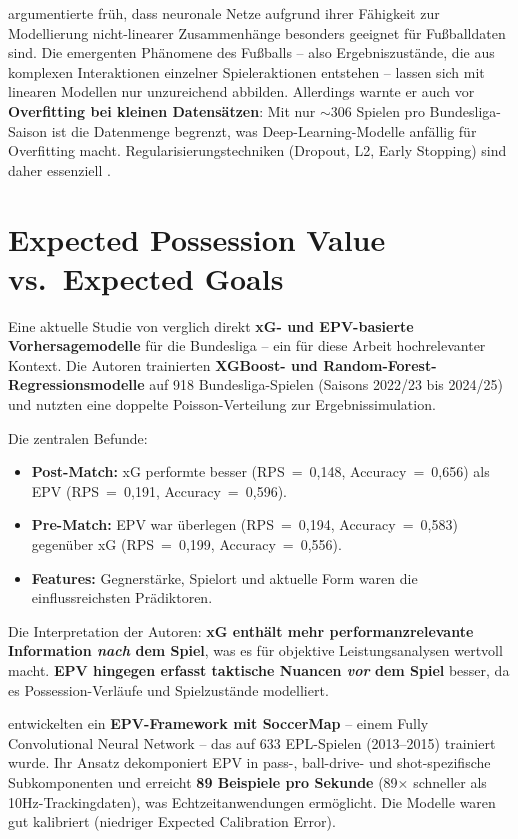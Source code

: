 \textcite{Sumpter2016} argumentierte früh, dass neuronale Netze aufgrund ihrer Fähigkeit zur Modellierung nicht-linearer Zusammenhänge besonders geeignet für Fußballdaten sind. Die \glqq emergenten Phänomene\grqq{} des Fußballs -- also Ergebniszustände, die aus komplexen Interaktionen einzelner Spieleraktionen entstehen -- lassen sich mit linearen Modellen nur unzureichend abbilden. Allerdings warnte er auch vor \textbf{Overfitting bei kleinen Datensätzen}: Mit nur $\sim$306 Spielen pro Bundesliga-Saison ist die Datenmenge begrenzt, was Deep-Learning-Modelle anfällig für Overfitting macht. Regularisierungstechniken (Dropout, L2, Early Stopping) sind daher essenziell \cite{GoodfellowEtAl2016,SrivastavaEtAl2014}.

\section{Expected Possession Value vs.\ Expected Goals}
\label{sec:epv-vs-xg}

Eine aktuelle Studie von \textcite{ForcherEtAl2025} verglich direkt \textbf{xG- und EPV-basierte Vorhersagemodelle} für die Bundesliga -- ein für diese Arbeit hochrelevanter Kontext. Die Autoren trainierten \textbf{XGBoost- und Random-Forest-Regressionsmodelle} auf 918 Bundesliga-Spielen (Saisons 2022/23 bis 2024/25) und nutzten eine doppelte Poisson-Verteilung zur Ergebnissimulation.

Die zentralen Befunde:
\begin{itemize}
    \item \textbf{Post-Match:} xG performte besser (RPS~=~0,148, Accuracy~=~0,656) als EPV (RPS~=~0,191, Accuracy~=~0,596).
    \item \textbf{Pre-Match:} EPV war überlegen (RPS~=~0,194, Accuracy~=~0,583) gegenüber xG (RPS~=~0,199, Accuracy~=~0,556).
    \item \textbf{Features:} Gegnerstärke, Spielort und aktuelle Form waren die einflussreichsten Prädiktoren.
\end{itemize}

Die Interpretation der Autoren: \textbf{xG enthält mehr performanzrelevante Information \textit{nach} dem Spiel}, was es für objektive Leistungsanalysen wertvoll macht. \textbf{EPV hingegen erfasst taktische Nuancen \textit{vor} dem Spiel} besser, da es Possession-Verläufe und Spielzustände modelliert.

\textcite{FernandezEtAl2021} entwickelten ein \textbf{EPV-Framework mit SoccerMap} -- einem Fully Convolutional Neural Network -- das auf 633 EPL-Spielen (2013--2015) trainiert wurde. Ihr Ansatz dekomponiert EPV in pass-, ball-drive- und shot-spezifische Subkomponenten und erreicht \textbf{89 Beispiele pro Sekunde} (89× schneller als 10Hz-Trackingdaten), was Echtzeitanwendungen ermöglicht. Die Modelle waren gut kalibriert (niedriger Expected Calibration Error).

